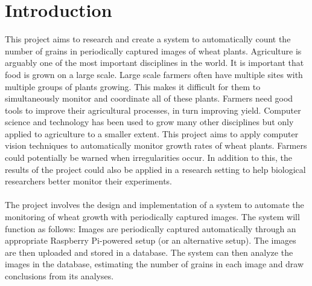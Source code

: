 \def\baselinestretch{1}

\chapter{Introduction}

\def\baselinestretch{1.66}



This project aims to research and create a system to automatically count the number of grains in periodically captured images of wheat plants. 
%
Agriculture is arguably one of the most important disciplines in the world. It is important that food is grown on a large scale. Large scale farmers often have multiple sites with multiple groups of plants growing. This makes it difficult for them to simultaneously monitor and coordinate all of these plants. Farmers need good tools to improve their agricultural processes, in turn improving yield.
%
Computer science and technology has been used to grow many other disciplines but only applied to agriculture to a smaller extent. This project aims to apply computer vision techniques to automatically monitor growth rates of wheat plants. Farmers could potentially be warned when irregularities occur. In addition to this, the results of the project could also be applied in a research setting to help biological researchers better monitor their experiments.\\ \\
%
The project involves the design and implementation of a system to automate the monitoring of wheat growth with periodically captured images. The system will function as follows: Images are periodically captured automatically through an appropriate Raspberry Pi-powered setup (or an alternative setup). The images are then uploaded and stored in a database. The system can then analyze the images in the database, estimating the number of grains in each image and draw conclusions from its analyses.

\smallskip

\goodbreak
